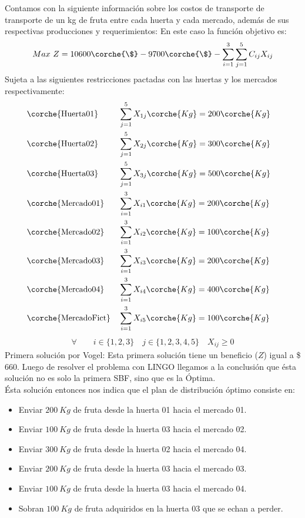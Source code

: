 
\begin{homeworkProblem}
Contamos con la siguiente información sobre los costos de transporte de transporte de un kg de fruta entre cada huerta y cada mercado, además de sus respectivas producciones y requerimientos:
En este caso la función objetivo es:
\begin{align*}
    Max\ Z = 10600\corche{\$} - 9700\corche{\$} - \sum_{i=1}^{3}{\sum_{j=1}^{5}{C_{ij}X_{ij}}}
\end{align*}
Sujeta a las siguientes restricciones pactadas con las huertas y los mercados respectivamente:
\begin{align*}
    &\corche{\text{Huerta01}}& &\sum_{j=1}^{5}{X_{1j}}\corche{Kg} = 200\corche{Kg}&\\ 
    &\corche{\text{Huerta02}}& &\sum_{j=1}^{5}{X_{2j}}\corche{Kg} = 300\corche{Kg}&\\ 
    &\corche{\text{Huerta03}}& &\sum_{j=1}^{5}{X_{3j}}\corche{Kg} = 500\corche{Kg}&\\ 
    &\corche{\text{Mercado01}}& &\sum_{i=1}^{3}{X_{i1}}\corche{Kg} = 200\corche{Kg}&\\ 
    &\corche{\text{Mercado02}}& &\sum_{i=1}^{3}{X_{i2}}\corche{Kg} = 100\corche{Kg}&\\ 
    &\corche{\text{Mercado03}}& &\sum_{i=1}^{3}{X_{i3}}\corche{Kg} = 200\corche{Kg}&\\ 
    &\corche{\text{Mercado04}}& &\sum_{i=1}^{3}{X_{i4}}\corche{Kg} = 400\corche{Kg}&\\ 
    &\corche{\text{MercadoFict}}& &\sum_{i=1}^{3}{X_{i5}}\corche{Kg} = 100\corche{Kg}&\\ 
\end{align*}
\begin{align*}
     \forall\quad\quad i \in \{1,2,3\}\quad j \in \{1,2,3,4,5\}\quad X_{ij} \ge 0
\end{align*}
Primera solución por Vogel:
Esta primera solución tiene un beneficio ($Z$) igual a \$ 660. Luego de resolver el problema con LINGO llegamos a la conclusión que ésta solución no es solo la primera SBF, sino que es la Óptima. \\
Ésta solución entonces nos indica que el plan de distribución óptimo consiste en:
\begin{itemize}
    \item Enviar $200\ Kg$ de fruta desde la huerta 01 hacia el mercado 01. 
    \item Enviar $100\ Kg$ de fruta desde la huerta 03 hacia el mercado 02. 
    \item Enviar $300\ Kg$ de fruta desde la huerta 02 hacia el mercado 04. 
    \item Enviar $200\ Kg$ de fruta desde la huerta 03 hacia el mercado 03. 
    \item Enviar $100\ Kg$ de fruta desde la huerta 03 hacia el mercado 04.
    \item Sobran $100\ Kg$ de fruta adquiridos en la huerta 03 que se echan a perder.
\end{itemize}

\end{homeworkProblem}

 
